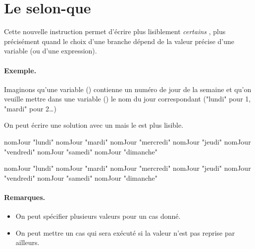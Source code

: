\clearpage
\section{Le selon-que}

	Cette nouvelle instruction permet d'écrire plus lisiblement
	\emph{certains} ,
	plus précisément quand le choix d'une branche dépend
	de la valeur précise d'une variable
	(ou d'une expression).

	\begin{Emphase}
		\paragraph{Exemple.}
		Imaginons qu'une variable () 
		contienne un numéro de jour de la semaine
		et qu'on veuille mettre dans une variable ()
		le nom du jour correspondant 
		("lundi" pour 1, "mardi" pour 2\dots)
		
		On peut écrire une solution avec un 
		mais le  est plus lisible.

		\begin{minipage}{6cm}
			\begin{LDA}
					\Let nomJour \Gets "lundi"
					\Let nomJour \Gets "mardi"
					\Let nomJour \Gets "mercredi"
					\Let nomJour \Gets "jeudi"
					\Let nomJour \Gets "vendredi"
					\Let nomJour \Gets "samedi"
				\Else
					\Let nomJour \Gets "dimanche"
				\EndIf
			\end{LDA}
		\end{minipage}
		\quad
		\begin{minipage}{6cm}
			\begin{LDA}
				\Switch{numéroJour}
				 nomJour \Gets "lundi"
				 nomJour \Gets "mardi"
				 nomJour \Gets "mercredi"
				 nomJour \Gets "jeudi"
				 nomJour \Gets "vendredi"
				 nomJour \Gets "samedi"
				 nomJour \Gets "dimanche"
				\EndSwitch
			\end{LDA}
		\end{minipage}
		
	\end{Emphase}

	\paragraph{Remarques.}
	\begin{itemize}
	\item
		On peut spécifier plusieurs valeurs pour un cas donné.
	\item
		On peut mettre un cas 
		qui sera exécuté si la valeur n'est pas reprise par ailleurs.
	\end{itemize}
	
